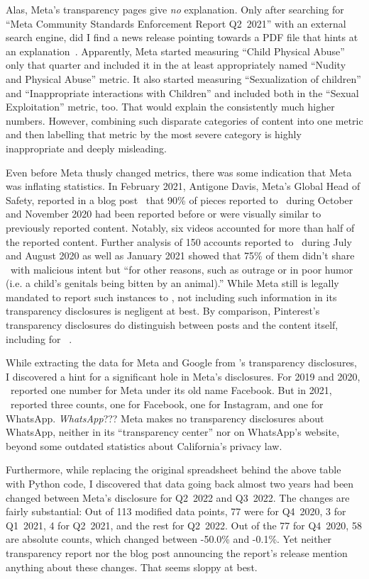 Alas, Meta's transparency pages give \emph{no} explanation. Only after searching
for ``Meta Community Standards Enforcement Report Q2~2021'' with an external
search engine, did I find a news release pointing towards a PDF file that hints
at an explanation~\cite{FIXME}. Apparently, Meta started measuring ``Child
Physical Abuse'' only that quarter and included it in the at least appropriately
named ``Nudity and Physical Abuse'' metric. It also started measuring
``Sexualization of children'' and ``Inappropriate interactions with Children''
and included both in the ``Sexual Exploitation'' metric, too. That would explain
the consistently much higher numbers. However, combining such disparate
categories of content into one metric and then labelling that metric by the most
severe category is highly inappropriate and deeply misleading.

Even before Meta thusly changed metrics, there was some indication that Meta was
inflating statistics. In February 2021, Antigone Davis, Meta's Global Head of
Safety, reported in a blog post~\cite{Davis2021} that 90\% of pieces reported to
\NCMEC\ during October and November 2020 had been reported before or were
visually similar to previously reported content. Notably, six videos accounted
for more than half of the reported content. Further analysis of 150 accounts
reported to \NCMEC\ during July and August 2020 as well as January 2021 showed
that 75\% of them didn't share \CSAM\ with malicious intent but ``for other
reasons, such as outrage or in poor humor (i.e. a child's genitals being bitten
by an animal).'' While Meta still is legally mandated to report such instances
to \NCMEC, not including such information in its transparency disclosures is
negligent at best. By comparison, Pinterest's transparency disclosures do
distinguish between posts and the content itself, including for
\CSAM~\cite{Pinterest2022}.

While extracting the data for Meta and Google from \NCMEC's transparency
disclosures, I discovered a hint for a significant hole in Meta's disclosures.
For 2019 and 2020, \NCMEC\ reported one number for Meta under its old name
Facebook. But in 2021, \NCMEC\ reported three counts, one for Facebook, one for
Instagram, and one for WhatsApp. \emph{WhatsApp}??? Meta makes no transparency
disclosures about WhatsApp, neither in its ``transparency center'' nor on
WhatsApp's website, beyond some outdated statistics about California's privacy
law.

Furthermore, while replacing the original spreadsheet behind the above table
with Python code, I discovered that data going back almost two years had been
changed between Meta's disclosure for Q2~2022 and Q3~2022. The changes are
fairly substantial: Out of 113 modified data points, 77 were for Q4~2020, 3 for
Q1~2021, 4 for Q2~2021, and the rest for Q2~2022. Out of the 77 for Q4~2020, 58
are absolute counts, which changed between -50.0\% and -0.1\%. Yet neither
transparency report nor the blog post announcing the report's release mention
anything about these changes. That seems sloppy at best.


